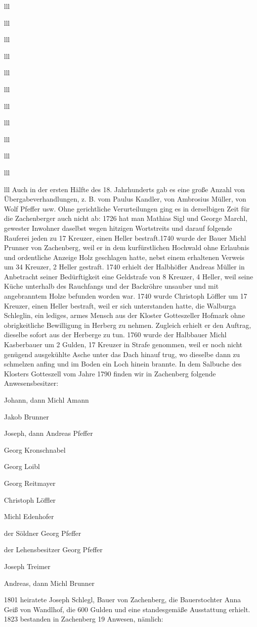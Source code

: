\documentclass[12pt,a4pager]{book}
\begin{document}
\begin{tabuluar}{lll}
\begin{tabuluar}{lll}
\begin{tabuluar}{lll}
\begin{tabuluar}{lll}
\begin{tabuluar}{lll}
\begin{tabuluar}{lll}
\begin{tabuluar}{lll}
\begin{tabuluar}{lll}
\begin{tabuluar}{lll}
\begin{tabuluar}{lll}
\begin{tabuluar}{lll}
\begin{tabuluar}{lll}
Auch in der ersten Hälfte des 18. Jahrhunderts gab es eine große Anzahl von
Übergabeverhandlungen, z. B. vom Paulus Kandler, von Ambrosius Müller, von Wolf
Pfeffer usw. Ohne gerichtliche Verurteilungen ging es in derselbigen Zeit für
die Zachenberger auch nicht ab: 1726 hat man Mathias Sigl und George Marchl,
gewester Inwohner daselbst wegen hitzigen Wortstreits und darauf folgende
Rauferei jeden zu 17 Kreuzer, einen Heller bestraft.1740 wurde der Bauer Michl
Prunner von Zachenberg, weil er in dem kurfürstlichen Hochwald ohne Erlaubnis
und ordentliche Anzeige Holz geschlagen hatte, nebst einem erhaltenen Verweis um
34 Kreuzer, 2 Heller gestraft. 1740 erhielt der Halbhöfler Andreas Müller in
Anbetracht seiner Bedürftigkeit eine Geldstrafe von 8 Kreuzer, 4 Heller, weil
seine Küche unterhalb des Rauchfangs und der Backröhre unsauber und mit
angebranntem Holze befunden worden war. 1740 wurde Christoph Löffler um 17
Kreuzer, einen Heller bestraft, weil er sich unterstanden hatte, die Walburga
Schleglin, ein lediges, armes Mensch aus der Kloster Gotteszeller Hofmark ohne
obrigkeitliche Bewilligung in Herberg zu nehmen. Zugleich erhielt er den
Auftrag, dieselbe sofort aus der Herberge zu tun. 1760 wurde der Halbbauer Michl
Kasberbauer um 2 Gulden, 17 Kreuzer in Strafe genommen, weil er noch nicht
genügend ausgekühlte Asche unter das Dach hinauf trug, wo dieselbe dann zu
schmelzen anfing und im Boden ein Loch hinein brannte. In dem Salbuche des
Klosters Gotteszell vom Jahre 1790 finden wir in Zachenberg folgende
Anwesensbesitzer:

\begin{description}
\item Johann, dann Michl Amann
\item Jakob Brunner
\item Joseph, dann Andreas Pfeffer
\item Georg Kronschnabel
\item Georg Loibl
\item Georg Reitmayer
\item Christoph Löffler
\item Michl Edenhofer
\item der Söldner Georg Pfeffer
\item der Lehensbesitzer Georg Pfeffer
\item Joseph Treimer
\item Andreas, dann Michl Brunner
\end{description}

1801 heiratete Joseph Schlegl, Bauer von Zachenberg, die Bauerstochter Anna Geiß
von Wandlhof, die 600 Gulden und eine standesgemäße Ausstattung erhielt. 1823
bestanden in Zachenberg 19 Anwesen, nämlich:


\end{tabuluar}
\end{tabuluar}
\end{tabuluar}
\end{tabuluar}
\end{tabuluar}
\end{tabuluar}
\end{tabuluar}
\end{tabuluar}
\end{tabuluar}
\end{tabuluar}
\end{tabuluar}
\end{tabuluar}
\end{document}
